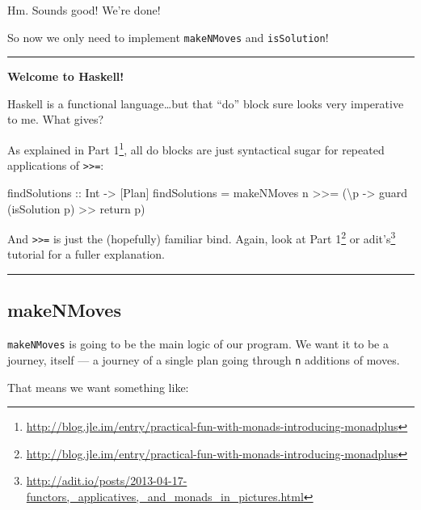 \documentclass[]{article}
\newenvironment{Shaded}{}{}
\newcommand{\DataTypeTok}[1]{\textcolor[rgb]{0.56,0.13,0.00}{{#1}}}
\newcommand{\OtherTok}[1]{\textcolor[rgb]{0.00,0.44,0.13}{{#1}}}
\newcommand{\FunctionTok}[1]{\textcolor[rgb]{0.02,0.16,0.49}{{#1}}}
\newcommand{\NormalTok}[1]{{#1}}
\renewcommand{\href}[2]{#2\footnote{\url{#1}}}
\begin{document}
Hm. Sounds good! We're done!

So now we only need to implement \texttt{makeNMoves} and
\texttt{isSolution}!

\begin{center}\rule{0.5\linewidth}{\linethickness}\end{center}

\textbf{Welcome to Haskell!}

Haskell is a functional language\ldots{}but that ``do'' block sure looks
very imperative to me. What gives?

As explained in
\href{http://blog.jle.im/entry/practical-fun-with-monads-introducing-monadplus}{Part
1}, all do blocks are just syntactical sugar for repeated applications
of \texttt{\textgreater{}\textgreater{}=}:

\begin{Shaded}
\begin{Highlighting}[]
\OtherTok{findSolutions ::} \DataTypeTok{Int} \OtherTok{->} \NormalTok{[}\DataTypeTok{Plan}\NormalTok{]}
\NormalTok{findSolutions }\FunctionTok{=}
    \NormalTok{makeNMoves n }\FunctionTok{>>=} \NormalTok{(\textbackslash{}p }\OtherTok{->} \NormalTok{guard (isSolution p) }\FunctionTok{>>} \NormalTok{return p)}
\end{Highlighting}
\end{Shaded}

And \texttt{\textgreater{}\textgreater{}=} is just the (hopefully)
familiar bind. Again, look at
\href{http://blog.jle.im/entry/practical-fun-with-monads-introducing-monadplus}{Part
1} or
\href{http://adit.io/posts/2013-04-17-functors,_applicatives,_and_monads_in_pictures.html}{adit's}
tutorial for a fuller explanation.

\begin{center}\rule{0.5\linewidth}{\linethickness}\end{center}

\subsection{makeNMoves}\label{makenmoves}

\texttt{makeNMoves} is going to be the main logic of our program. We
want it to be a journey, itself --- a journey of a single plan going
through \texttt{n} additions of moves.

That means we want something like:
\end{document}
